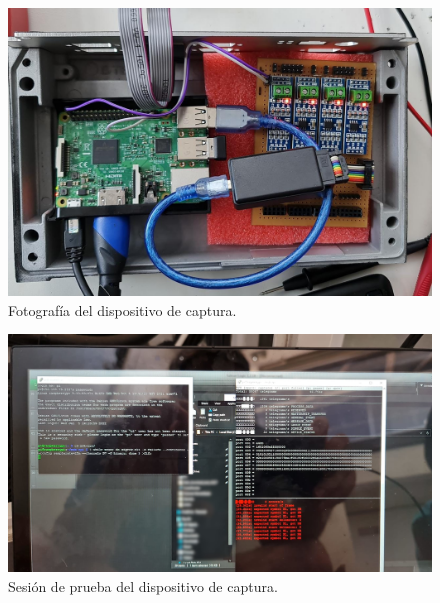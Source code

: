 \begin{figure}[htbp]
	\centering
	\includegraphics[width=\textwidth]{./Figures/disp-captura.jpg}
	\caption{Fotografía del dispositivo de captura.}
    \label{fig:disp-captura}
\end{figure}

\begin{figure}[htbp]
	\centering
	\includegraphics[width=\textwidth]{./Figures/disp-captura-ssh.jpg}
	\caption{Sesión de prueba del dispositivo de captura.}
    \label{fig:disp-captura-ssh}
\end{figure}
